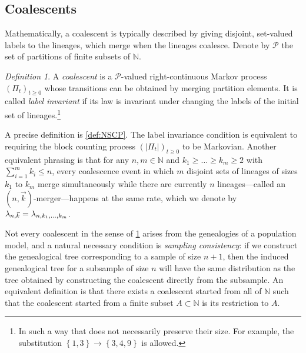 \documentclass[reqno,draft]{amsart}
\numberwithin{equation}{section}
\theoremstyle{plain}
\theoremstyle{remark}
\newtheorem{definition}[theorem]{Definition}
\newcommand{\N}{\mathbb{N}} %
\newcommand{\fpart}{\Pi} %
\newcommand{\lank}{\lambda_{n,\smash{\vec{k}}}}
\begin{document}
\subsection{Coalescents}\label{sec:coalintro}
Mathematically, a coalescent is typically described by giving disjoint, set-valued labels to the lineages, which merge when the lineages coalesce. Denote by $\mathcal{P}$ the set of partitions of finite subsets of $\N$.

\begin{definition}\label{def:NSCPintro}
    A \emph{coalescent} is a $\mathcal{P}$-valued right-continuous Markov process $(\fpart_t)_{t \ge 0}$ whose transitions can be obtained by merging partition elements. It is called \emph{label invariant} if its law is invariant under changing the labels of the initial set of lineages.\footnote{In such a way that does not necessarily preserve their size. For example, the substitution $\left\{ 1,3 \right\} \to \left\{ 3,4,9 \right\} $ is allowed.}
\end{definition}
A precise definition is \cref{def:NSCP}. The label invariance condition is equivalent to requiring the block counting process $(|\fpart_t|)_{t \ge 0}$ to be Markovian. %
Another equivalent phrasing is that for any $n,m\in \N$ and $k_1 \ge \ldots \ge k_m \ge 2$ with $\sum_{i=1}^m k_i \le n$, every coalescence event in which $m$ disjoint sets of lineages of sizes $k_1$ to $k_m$ merge simultaneously while there are currently $n$ lineages---called an $(n,\vec{k})$-merger---happens at the same rate, which we denote by $\lank = \lambda_{n,k_1, \ldots ,k_m}$. %

Not every coalescent in the sense of \cref{def:NSCPintro} arises from the genealogies of a population model, and a natural necessary condition is \emph{sampling consistency}: if we construct the genealogical tree corresponding to a sample of size $n+1$, then the induced genealogical tree for a subsample of size $n$ will have the same distribution as the tree obtained by constructing the coalescent directly from the subsample. %
An equivalent definition is that there exists a coalescent started from all of $\N$ such that the coalescent started from a finite subset $A \subset \N$ is its restriction to $A$.
\end{document}

